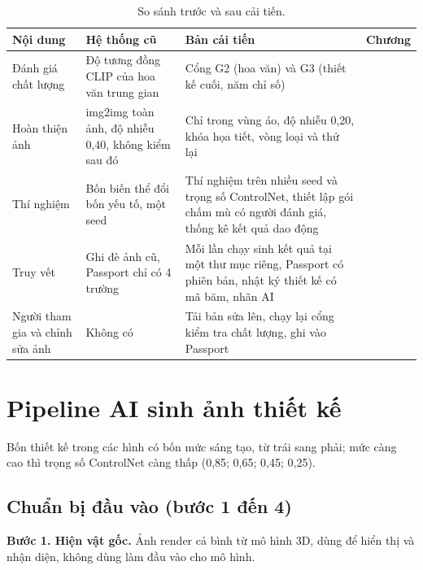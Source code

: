 \documentclass[12pt,a4paper]{report}
\begin{document}
\begin{table}[H]
\centering
\small
\caption{So sánh trước và sau cải tiến.}
\label{tab:truocsau}
\begin{tabularx}{\textwidth}{>{\raggedright\arraybackslash}p{3.0cm}>{\raggedright\arraybackslash}X>{\raggedright\arraybackslash}X>{\raggedright\arraybackslash}p{1.6cm}}
\toprule
\textbf{Nội dung} & \textbf{Hệ thống cũ} & \textbf{Bản cải tiến} & \textbf{Chương} \\
\midrule
Đánh giá chất lượng & Độ tương đồng CLIP của hoa văn trung gian & Cổng G2 (hoa văn) và G3 (thiết kế cuối, năm chỉ số) & 3 \\
Hoàn thiện ảnh & img2img toàn ảnh, độ nhiễu 0,40, không kiểm sau đó & Chỉ trong vùng áo, độ nhiễu 0,20, khóa họa tiết, vòng loại và thử lại & 3 \\
Thí nghiệm & Bốn biến thể đổi bốn yếu tố, một seed & Thí nghiệm trên nhiều seed và trọng số ControlNet, thiết lập gói chấm mù có người đánh giá, thống kê kết quả dao động & 4 \\
Truy vết & Ghi đè ảnh cũ, Passport chỉ có 4 trường & Mỗi lần chạy sinh kết quả tại một thư mục riêng, Passport có phiên bản, nhật ký thiết kế có mã băm, nhãn AI & 5 \\
Người tham gia và chỉnh sửa ảnh & Không có & Tải bản sửa lên, chạy lại cổng kiểm tra chất lượng, ghi vào Passport & 5 \\
\bottomrule
\end{tabularx}
\end{table}

\chapter{Pipeline AI sinh ảnh thiết kế}



Bốn thiết kế trong các hình có bốn mức sáng tạo, từ trái sang phải; mức càng cao thì trọng số ControlNet càng thấp (0,85; 0,65; 0,45; 0,25).

\section{Chuẩn bị đầu vào (bước 1 đến 4)}

\textbf{Bước 1. Hiện vật gốc.} Ảnh render cả bình từ mô hình 3D, dùng để hiển thị và nhận diện, không dùng làm đầu vào cho mô hình.
\end{document}

